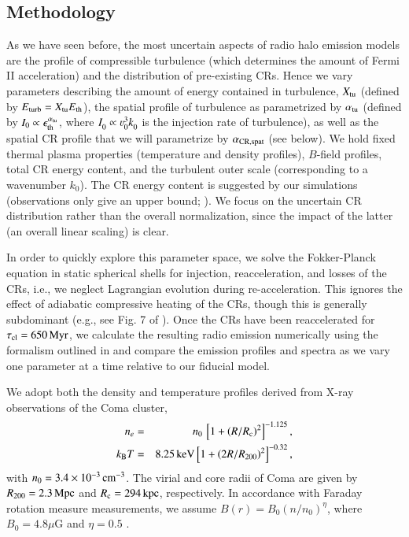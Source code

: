 \documentclass[fleqn,usenatbib,useAMS]{mnras}
\begin{document}
\subsection{Methodology}

As we have seen before, the most uncertain aspects of radio halo
emission models are the profile of compressible turbulence (which
determines the amount of Fermi II acceleration) and the distribution
of pre-existing CRs. Hence we vary parameters describing the amount of
energy contained in turbulence, $X_{\rm tu}$ (defined by $E_{\rm
  turb} = X_{\rm tu} E_{\rm th}$), the spatial profile of
turbulence as parametrized by $\alpha_{\rm tu}$ (defined by $I_0
\propto \epsilon_{\rm th}^{\alpha_{\rm tu}}$, where $I_0^{} \propto
\varv_0^{3} k_0^{}$ is the injection rate of turbulence), as well as
the spatial CR profile that we will parametrize by $\alpha_{\rm CR,
  spat}$ (see below).  We hold fixed thermal plasma properties
(temperature and density profiles), $B$-field profiles, total CR energy
content, and the turbulent outer scale (corresponding to a wavenumber
$k_{0}$). The CR energy content is suggested by our simulations
(observations only give an upper bound;
\citealt{2012ApJ...757..123A}). We focus on the uncertain CR
distribution rather than the overall normalization, since the impact
of the latter (an overall linear scaling) is clear.

In order to quickly explore this parameter space, we solve the
Fokker-Planck equation in static spherical shells for injection,
reacceleration, and losses of the CRs, i.e., we neglect Lagrangian
evolution during re-acceleration.  This ignores the effect of
adiabatic compressive heating of the CRs, though this is generally
subdominant (e.g., see Fig. 7 of \citealt{miniati15}). Once
the CRs have been reaccelerated for $\tau_{\mathrm{cl}} = 650\,{\mathrm{Myr}}$,
we calculate the resulting radio emission numerically using the
formalism outlined in \cite{1979rpa..book.....R} and compare the
emission profiles and spectra as we vary one parameter at a time
relative to our fiducial model.

We adopt both the density \citep{1992A&A...259L..31B} and temperature
profiles \citep{2009ApJ...696.1886B,2001A&A...365L..67A} derived from
X-ray observations of the Coma cluster,
\begin{eqnarray}
n_e &=& n_0\,\left[1+\left(R/R_{{\mathrm{c}}}\right)^2\right]^{-1.125},\nonumber\\
k_{{\mathrm{B}}} T &=& 8.25\,{\mathrm{keV}} \left[1+\left(2R/R_{200}\right)^2\right]^{-0.32},
\end{eqnarray}
with $n_0=3.4\times10^{-3}\,{\mathrm{cm}}^{-3}$.  The virial and core radii
of Coma are given by $R_{200} = 2.3\,{\mathrm{Mpc}}$
\citep{2002ApJ...567..716R} and $R_{{\mathrm{c}}} = 294\,{\mathrm{kpc}}$,
respectively. In accordance with Faraday rotation measure
measurements, we assume $B(r)=B_{0} (n/n_{0})^{\eta}$, where
$B_{0}=4.8 \mu$G and $\eta=0.5$ \citep{bonafede10}.
\end{document}
